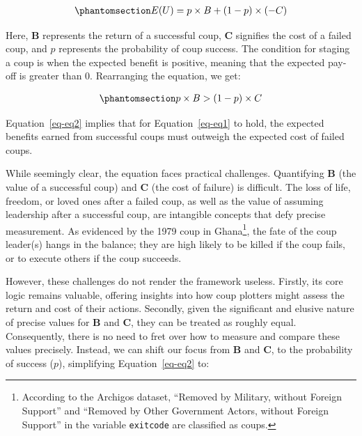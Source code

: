 \documentclass[
  12pt,
]{report}
\begin{document}
\begin{equation}\phantomsection\label{eq-eq1}{
\begin{aligned}
E(U) = p \times B + (1 - p) \times (-C)
\end{aligned}
}\end{equation}

Here, \(\mathbf B\) represents the return of a successful coup,
\(\mathbf C\) signifies the cost of a failed coup, and \(p\) represents
the probability of coup success. The condition for staging a coup is
when the expected benefit is positive, meaning that the expected pay-off
is greater than 0. Rearranging the equation, we get:

\begin{equation}\phantomsection\label{eq-eq2}{
\begin{aligned}
p \times B > (1 - p) \times C
\end{aligned}
}\end{equation}

Equation~\ref{eq-eq2} implies that for Equation~\ref{eq-eq1} to hold,
the expected benefits earned from successful coups must outweigh the
expected cost of failed coups.

While seemingly clear, the equation faces practical challenges.
Quantifying \(\mathbf B\) (the value of a successful coup) and
\(\mathbf C\) (the cost of failure) is difficult. The loss of life,
freedom, or loved ones after a failed coup, as well as the value of
assuming leadership after a successful coup, are intangible concepts
that defy precise measurement. As evidenced by the 1979 coup in
Ghana\footnote{According to the Archigos dataset, ``Removed by Military,
  without Foreign Support'' and ``Removed by Other Government Actors,
  without Foreign Support'' in the variable \texttt{exitcode} are
  classified as coups.}, the fate of the coup leader(s) hangs in the
balance; they are high likely to be killed if the coup fails, or to
execute others if the coup succeeds.

However, these challenges do not render the framework useless. Firstly,
its core logic remains valuable, offering insights into how coup
plotters might assess the return and cost of their actions. Secondly,
given the significant and elusive nature of precise values for
\(\mathbf B\) and \(\mathbf C\), they can be treated as roughly equal.
Consequently, there is no need to fret over how to measure and compare
these values precisely. Instead, we can shift our focus from
\(\mathbf B\) and \(\mathbf C\), to the probability of success (\(p\)),
simplifying Equation~\ref{eq-eq2} to:
\end{document}
